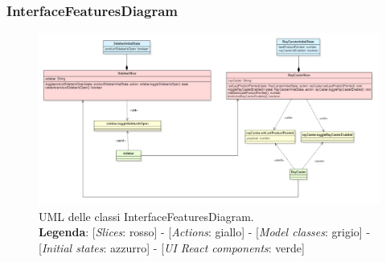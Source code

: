 	\begin{landscape}
		\thispagestyle{empty}
		\subsubsection{InterfaceFeaturesDiagram}
\begin{figure}[H]
	\centering
	\includegraphics[scale=0.75, keepaspectratio]{./res/images/interfaceFeaturesDiagram.PNG}
	\caption[UML delle classi InterfaceFeaturesDiagram]{
	UML delle classi InterfaceFeaturesDiagram.
	\\
	\textbf{Legenda}: 
	[\textit{Slices}: rosso] -
	[\textit{Actions}: giallo] -
	[\textit{Model classes}: grigio] -
	[\textit{Initial states}: azzurro] -
	[\textit{UI React components}: verde]}
\end{figure}
\end{landscape}
\restoregeometry
